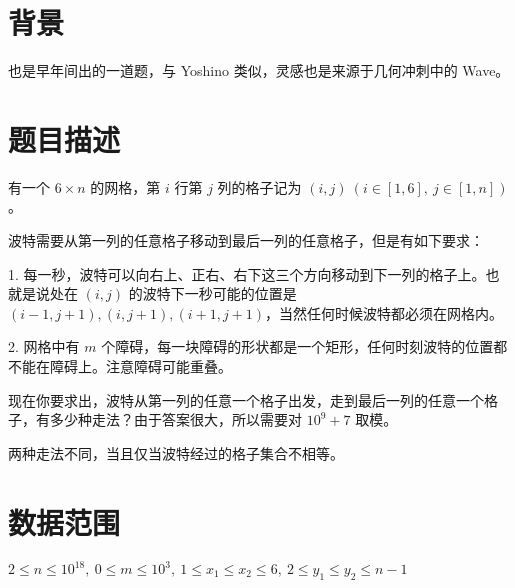 \documentclass[a4paper,10pt]{article}
\begin{document}
\newpage

\section*{背景}

也是早年间出的一道题，与 Yoshino 类似，灵感也是来源于几何冲刺中的 Wave。

\section*{题目描述}

有一个 $6\times n$ 的网格，第 $i$ 行第 $j$ 列的格子记为 $(i,j)\ (i\in [1,6],\ j\in [1,n])$。

波特需要从第一列的任意格子移动到最后一列的任意格子，但是有如下要求：

1. 每一秒，波特可以向右上、正右、右下这三个方向移动到下一列的格子上。也就是说处在 $(i,j)$ 的波特下一秒可能的位置是 $(i-1,j+1),(i,j+1),(i+1,j+1)$，当然任何时候波特都必须在网格内。

2. 网格中有 $m$ 个障碍，每一块障碍的形状都是一个矩形，任何时刻波特的位置都不能在障碍上。注意障碍可能重叠。

现在你要求出，波特从第一列的任意一个格子出发，走到最后一列的任意一个格子，有多少种走法？由于答案很大，所以需要对 $10^9+7$ 取模。

两种走法不同，当且仅当波特经过的格子集合不相等。

\section*{数据范围}

$2\leq n\leq 10^{18},\ 0\leq m\leq 10^3,\ 1\leq x_1\leq x_2\leq 6,\ 2\leq y_1\leq y_2\leq n​-1$

\newpage
\end{document}
